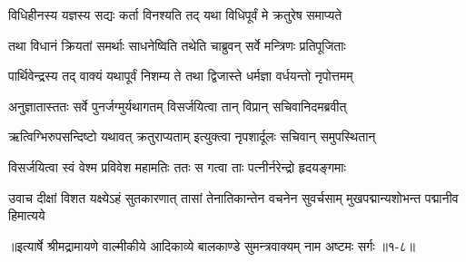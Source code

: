 \twolineshloka
{विधिहीनस्य यज्ञस्य सद्यः कर्ता विनश्यति}
{तद् यथा विधिपूर्वं मे क्रतुरेष समाप्यते} %

\twolineshloka
{तथा विधानं क्रियतां समर्थाः साधनेष्विति}
{तथेति चाब्रुवन् सर्वे मन्त्रिणः प्रतिपूजिताः} %

\twolineshloka
{पार्थिवेन्द्रस्य तद् वाक्यं यथापूर्वं निशम्य ते}
{तथा द्विजास्ते धर्मज्ञा वर्धयन्तो नृपोत्तमम्} %

\twolineshloka
{अनुज्ञातास्ततः सर्वे पुनर्जग्मुर्यथागतम्}
{विसर्जयित्वा तान् विप्रान् सचिवानिदमब्रवीत्} %

\twolineshloka
{ऋत्विग्भिरुपसन्दिष्टो यथावत् क्रतुराप्यताम्}
{इत्युक्त्वा नृपशार्दूलः सचिवान् समुपस्थितान्} %

\twolineshloka
{विसर्जयित्वा स्वं वेश्म प्रविवेश महामतिः}
{ततः स गत्वा ताः पत्नीर्नरेन्द्रो हृदयङ्गमाः} %

\threelineshloka
{उवाच दीक्षां विशत यक्ष्येऽहं सुतकारणात्}
{तासां तेनातिकान्तेन वचनेन सुवर्चसाम्}
{मुखपद्मान्यशोभन्त पद्मानीव हिमात्यये} %


॥इत्यार्षे श्रीमद्रामायणे वाल्मीकीये आदिकाव्ये बालकाण्डे सुमन्त्रवाक्यम् नाम अष्टमः सर्गः ॥१-८॥
